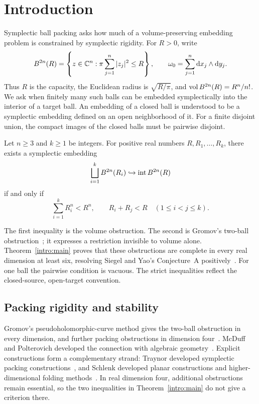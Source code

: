 \section{Introduction}\label{intro:section}

Symplectic ball packing asks how much of a volume-preserving embedding
problem is constrained by symplectic rigidity. For \(R>0\), write
\[
 B^{2n}(R)=
 \left\{z\in\mathbb C^n:\pi\sum_{j=1}^n|z_j|^2\le R\right\},
 \qquad
 \omega_0=\sum_{j=1}^n\mathrm d x_j\wedge\mathrm d y_j.
\]
Thus \(R\) is the capacity, the Euclidean radius is \(\sqrt{R/\pi}\),
and \(\operatorname{vol} B^{2n}(R)=R^n/n!\). We ask when finitely many such balls
can be embedded symplectically into the interior of a target ball.
An embedding of a closed ball is understood to be a symplectic embedding
defined on an open neighborhood of it. For a finite disjoint union, the
compact images of the closed balls must be pairwise disjoint.

\begin{theorem}\label{intro:main}
Let \(n\ge3\) and \(k\ge1\) be integers. For positive real numbers
\(R,R_1,\ldots,R_k\), there exists a symplectic embedding
\[
 \bigsqcup_{i=1}^k B^{2n}(R_i)
 \hookrightarrow \operatorname{int} B^{2n}(R)
\]
if and only if
\begin{equation}\label{intro:inequalities}
 \sum_{i=1}^k R_i^n<R^n,
 \qquad
 R_i+R_j<R\quad (1\le i<j\le k).
\end{equation}
\end{theorem}

The first inequality is the volume obstruction. The second is Gromov's
two-ball obstruction~\cite{Gromov1985}; it expresses a restriction
invisible to volume alone. Theorem~\ref{intro:main} proves that these
obstructions are complete in every real dimension at least six, resolving
Siegel and Yao's Conjecture~A positively~\cite{SiegelYao2025}. For one
ball the pairwise condition is vacuous. The strict inequalities reflect
the closed-source, open-target convention.

\subsection{Packing rigidity and stability}

Gromov's pseudoholomorphic-curve method gives the two-ball obstruction
in every dimension, and further packing obstructions in dimension
four~\cite[Section~0.3.B]{Gromov1985}. McDuff and Polterovich developed
the connection with algebraic geometry~\cite{McDuffPolterovich}.
Explicit constructions form a complementary strand: Traynor developed
symplectic packing constructions~\cite{Traynor}, and Schlenk developed
planar constructions and higher-dimensional folding
methods~\cite{SchlenkHand,SchlenkBook}. In real dimension four,
additional obstructions remain essential, so the two inequalities in
Theorem~\ref{intro:main} do not give a criterion there.

